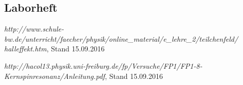 \documentclass[12pt]{article}
\begin{document}

%


%

\newpage
\subsection{Laborheft}

\newpage
\listoffigures


\newpage
\thispagestyle{empty}
\begin{thebibliography}{9}

  

  
  
\emph{http://www.schule-bw.de/unterricht/faecher/physik/online\_material/e\_lehre\_2/teilchenfeld/\\halleffekt.htm}, Stand 15.09.2016

\emph{http://hacol13.physik.uni-freiburg.de/fp/Versuche/FP1/FP1-8-Kernspinresonanz/Anleitung.pdf}, Stand 15.09.2016
\end{thebibliography}
\end{document}
